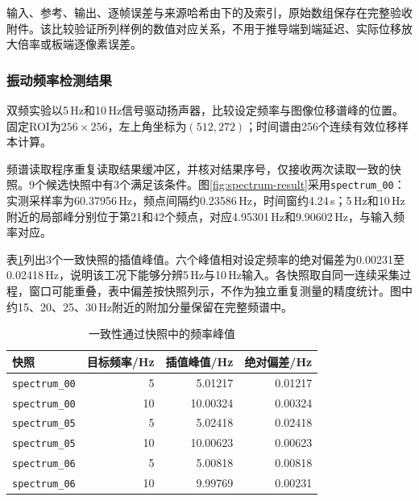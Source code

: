 输入、参考、输出、逐帧误差与来源哈希由下的及索引，原始数组保存在完整验收附件。该比较验证所列样例的数值对应关系，不用于推导端到端延迟、实际位移放大倍率或板端逐像素误差。

\subsubsection{振动频率检测结果}
双频实验以5\,Hz和10\,Hz信号驱动扬声器，比较设定频率与图像位移谱峰的位置。固定ROI为$256\times256$，左上角坐标为$(512,272)$；时间谱由256个连续有效位移样本计算。

频谱读取程序重复读取结果缓冲区，并核对结果序号，仅接收两次读取一致的快照。9个候选快照中有3个满足该条件。图\ref{fig:spectrum-result}采用\texttt{spectrum\_00}：实测采样率为60.37956\,Hz，频点间隔约0.23586\,Hz，时间窗约4.24\,s；5\,Hz和10\,Hz附近的局部峰分别位于第21和42个频点，对应4.95301\,Hz和9.90602\,Hz，与输入频率对应。


表\ref{tab:frequency-peaks}列出3个一致快照的插值峰值。六个峰值相对设定频率的绝对偏差为0.00231至0.02418\,Hz，说明该工况下能够分辨5\,Hz与10\,Hz输入。各快照取自同一连续采集过程，窗口可能重叠，表中偏差按快照列示，不作为独立重复测量的精度统计。图中约15、20、25、30\,Hz附近的附加分量保留在完整频谱中。

\begin{table}[htbp]
\centering\small
\caption{一致性通过快照中的频率峰值}\label{tab:frequency-peaks}
\begin{tabular}{@{}lrrr@{}}
\toprule
快照 & 目标频率/Hz & 插值峰值/Hz & 绝对偏差/Hz \\
\midrule
\texttt{spectrum\_00} & 5 & 5.01217 & 0.01217 \\
\texttt{spectrum\_00} & 10 & 10.00324 & 0.00324 \\
\texttt{spectrum\_05} & 5 & 5.02418 & 0.02418 \\
\texttt{spectrum\_05} & 10 & 10.00623 & 0.00623 \\
\texttt{spectrum\_06} & 5 & 5.00818 & 0.00818 \\
\texttt{spectrum\_06} & 10 & 9.99769 & 0.00231 \\
\bottomrule
\end{tabular}
\end{table}

